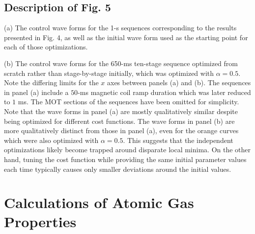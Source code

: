 \documentclass{article}
\begin{document}
\subsection{Description of Fig. 5}

(a) The control wave forms for the 1-s sequences corresponding to the results presented in Fig. 4, as well as the initial wave form used as the starting point for each of those optimizations. 

(b) The control wave forms for the 650-ms ten-stage sequence optimized from scratch rather than stage-by-stage initially, which was optimized with $\alpha = 0.5$. Note the differing limits for the $x$ axes between panels (a) and (b). The sequences in panel (a) include a $50$-ms magnetic coil ramp duration which was later reduced to $1$ ms. The MOT sections of the sequences have been omitted for simplicity. Note that the wave forms in panel (a) are mostly qualitatively similar despite being optimized for different cost functions. The wave forms in panel (b) are more qualitatively distinct from those in panel (a), even for the orange curves which were also optimized with $\alpha = 0.5$. This suggests that the independent optimizations likely become trapped around disparate local minima. On the other hand, tuning the cost function while providing the same initial parameter values each time typically causes only smaller deviations around the initial values.

\section{Calculations of Atomic Gas Properties}
\label{sec:atomic gas properties}
\end{document}
